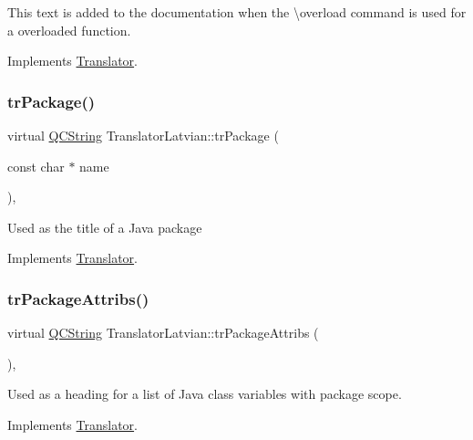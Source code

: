 This text is added to the documentation when the \textbackslash{}overload command is used for a overloaded function. 

Implements \mbox{\hyperlink{class_translator}{Translator}}.

\mbox{\label{class_translator_latvian_ab641c411f7c3ba65894e8d1615dffdff}} 
\subsubsection{\texorpdfstring{trPackage()}{trPackage()}}
{\footnotesize\ttfamily virtual \mbox{\hyperlink{class_q_c_string}{Q\+C\+String}} Translator\+Latvian\+::tr\+Package (\begin{DoxyParamCaption}\item[{const char $\ast$}]{name }\end{DoxyParamCaption})\hspace{0.3cm}{\ttfamily [inline]}, {\ttfamily [virtual]}}

Used as the title of a Java package 

Implements \mbox{\hyperlink{class_translator}{Translator}}.

\mbox{\label{class_translator_latvian_af63e436d228cae8f81fe84bb299eed10}} 
\subsubsection{\texorpdfstring{trPackageAttribs()}{trPackageAttribs()}}
{\footnotesize\ttfamily virtual \mbox{\hyperlink{class_q_c_string}{Q\+C\+String}} Translator\+Latvian\+::tr\+Package\+Attribs (\begin{DoxyParamCaption}{ }\end{DoxyParamCaption})\hspace{0.3cm}{\ttfamily [inline]}, {\ttfamily [virtual]}}

Used as a heading for a list of Java class variables with package scope. 

Implements \mbox{\hyperlink{class_translator}{Translator}}.

\mbox{\label{class_translator_latvian_ac0df2d19e07165d86e21d1dd1d79d797}} 
